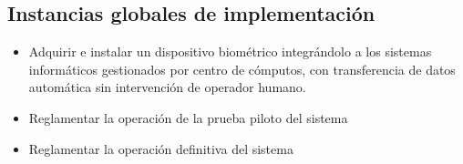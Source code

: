 \documentclass[a4paper, 11pt]{article} %
\begin{document}
\subsection*{Instancias globales de implementación}
\begin{itemize}
	\item Adquirir e instalar un dispositivo biométrico integrándolo a los sistemas informáticos gestionados por centro de cómputos, con transferencia de datos automática sin intervención de operador humano.
	\item Reglamentar la operación de la prueba piloto del sistema
	\item Reglamentar la operación definitiva del sistema
\end{itemize}
\end{document}
